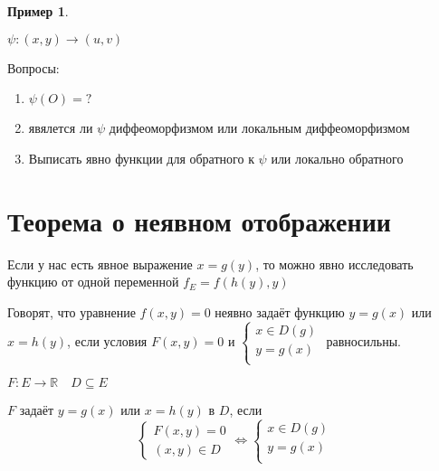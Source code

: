 \documentclass{book}
\newcommand\R{\ensuremath{\mathbb{R}}}
\theoremstyle{definition}
\newtheorem*{example}{Пример}
\begin{document}
\begin{example}
\begin{enumerate}
\begin{problem}
                        $\psi:(x, y) \to (u, v)$

                        Вопросы:
                        \begin{enumerate}
                            \item $\psi(O) = ?$
                            \item явялется ли  $\psi$ диффеоморфизмом или локальным диффеоморфизмом 
                            \item Выписать явно функции для обратного к $\psi$ или локально обратного
                        \end{enumerate}
                    \end{problem}
            \end{enumerate}
        \end{example}

        \section{Теорема о неявном отображении}

        Если у нас есть явное выражение $x = g(y)$, то можно явно исследовать функцию от одной переменной $f_E = f\left( h(y), y \right) $

         \begin{definition}
             Говорят, что уравнение $f(x,y) = 0$ неявно задаёт функцию  $y = g(x)$ или  $x = h(y)$, если условия  $F(x,y) = 0$ и  $\begin{cases}
                 x\in D(g)\\
                 y = g(x)\\
             \end{cases}$ равносильны.
         \end{definition}

         \begin{definition}
             $F:E\to \R\quad D\subseteq E$

             $F$ задаёт  $y = g(x)$ или  $x = h(y)$ в $D$, если \[\begin{cases}
                 F(x,y) = 0\\(x,y)\in D
             \end{cases} \iff \begin{cases}
             x\in D(g)\\
             y = g(x)\\
             \end{cases}\]
         \end{definition}
\end{document}
